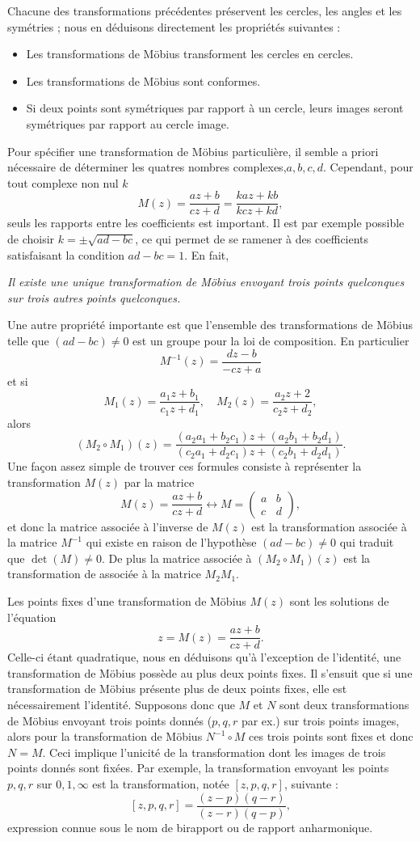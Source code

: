 Chacune des transformations précédentes préservent les cercles, les angles et les symétries ; nous en déduisons directement les propriétés suivantes :
\begin{itemize}
\item Les transformations de Möbius transforment les cercles en cercles.
\item Les transformations de Möbius sont conformes.
\item Si deux points sont symétriques par rapport à un cercle, leurs images seront symétriques par rapport au cercle image.
\end{itemize}
Pour spécifier une transformation de Möbius particulière, il semble a priori nécessaire de déterminer les quatres nombres complexes,$a,b,c,d$. Cependant, pour tout complexe non nul $k$ 
\[M(z)= \frac{a z +b}{c z +d}=\frac{k a z +k b}{k c z +k d},\]
seuls les rapports entre les coefficients est important. Il est par exemple possible de choisir $k=\pm \sqrt{ad-bc}$, ce qui permet de se ramener à des coefficients satisfaisant la condition $ad-bc=1$. En fait, 

\emph{Il existe une unique transformation de Möbius envoyant trois points quelconques sur trois autres points quelconques.}

Une autre propriété importante est que l'ensemble des transformations de Möbius telle que $(ad-bc) \neq 0$ est un groupe pour la loi de composition. En particulier 
\[M^{-1}(z)=\frac{dz-b}{-cz +a}\]
et si 
\[M_1(z)=\frac{a_1 z +b_1}{c_1 z +d_1}, \quad M_2(z)=\frac{a_2 z +2}{c_2 z +d_2},\]
alors
\[(M_2 \circ M_1)(z)=\frac{(a_2 a_1 + b_2 c_1) z + (a_2 b_1 + b_2 d_1)}{(c_2a_1 + d_2 c_1)z +(c_2 b_1 + d_2 d_1)}.\]
Une façon assez simple de trouver ces formules consiste à représenter la transformation $M(z)$ par la matrice
\[M(z)=\frac{a z +b}{cz +d} \longleftrightarrow M=\begin{pmatrix}
a &b\\c&d
\end{pmatrix},\]
et donc la matrice associée à l'inverse de $M(z)$ est la transformation associée à la matrice $M^{-1}$ qui existe en raison de l'hypothèse $(ad -bc) \neq 0$ qui traduit que $\det(M) \neq 0$. De plus la matrice associée à $(M_2 \circ M_1)(z)$ est la transformation de associée à la matrice $M_2 M_1$. 


Les points fixes d'une transformation de Möbius $M(z)$ sont les solutions de l'équation 
\[z=M(z)=\frac{a z +b}{c z +d}.\]
Celle-ci étant quadratique, nous en déduisons qu'à l'exception de l'identité, une transformation de Möbius possède au plus deux points fixes. Il s'ensuit que si une transformation de Möbius présente plus de deux points fixes, elle est nécessairement l'identité. Supposons donc que $M$ et $N$ sont deux transformations de Möbius envoyant trois points donnés ($p,q,r$ par ex.) sur trois points images, alors pour la transformation de Möbius $N^{-1} \circ M$ ces trois points sont fixes et donc $N=M$. Ceci implique l'unicité de la transformation dont les images de trois points donnés sont fixées. Par exemple, la transformation envoyant les points $p,q,r$ sur $0,1,\infty$ est la transformation, notée $[z,p,q,r]$, suivante :
\[[z,p,q,r] =\frac{(z-p)(q-r)}{(z-r)(q-p)},\]
expression connue sous le nom de birapport ou de rapport anharmonique.

